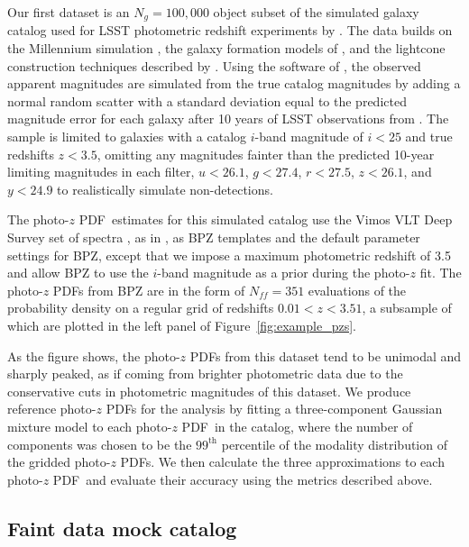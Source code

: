 \documentclass[\docopts]{\docclass}
\newcommand{\pz}{photo-$z$ PDF}
\newcommand{\Ssdata}{Faint\xspace}
\begin{document}
Our first dataset is an $N_{g}=100,000$ object subset of the simulated galaxy 
catalog used for LSST photometric redshift experiments by 
\citet{graham_photometric_2017}.
The data builds on the Millennium simulation \citep{springel_simulations_2005}, 
the galaxy formation models of \citet{gonzalez-perez_how_2014}, and the 
lightcone construction techniques described by \citet{merson_lightcone_2013}.
Using the software of \citet{connolly_end--end_2014}, the observed apparent 
magnitudes are simulated from the true catalog magnitudes by adding a normal 
random scatter with a standard deviation equal to the predicted magnitude error 
for each galaxy after 10 years of LSST observations from 
\citet{ivezic_lsst:_2008}.
The sample is limited to galaxies with a catalog $i$-band magnitude of $i<25$ 
and true redshifts $z<3.5$, omitting any magnitudes fainter than the predicted 
10-year limiting magnitudes in each filter, $u<26.1$, $g<27.4$, $r<27.5$, 
$z<26.1$, and $y<24.9$ to realistically simulate non-detections.

The \pz\ estimates for this simulated catalog use the Vimos VLT Deep Survey set 
of spectra \citep{fevre_vimos_2005}, as in \citet{ilbert_accurate_2006}, as BPZ 
templates and the default parameter settings for BPZ, except that we impose a 
maximum photometric redshift of 3.5 and allow BPZ to use the $i$-band magnitude 
as a prior during the photo-$z$ fit.
The \pz s from BPZ are in the form of $N_{ff} = 351$ evaluations of the 
probability density on a regular grid of redshifts $0.01 < z < 3.51$, a 
subsample of which are plotted in the left panel of 
Figure~\ref{fig:example_pzs}.

As the figure shows, the \pz s from this dataset tend to be unimodal and 
sharply peaked, as if coming from brighter photometric data due to the 
conservative cuts in photometric magnitudes of this dataset.
We produce reference \pz s for the analysis by fitting a three-component 
Gaussian mixture model to each \pz\ in the catalog, where the number of 
components was chosen to be the $99^{\mathrm{th}}$ percentile of the modality 
distribution of the gridded \pz s.
We then calculate the three approximations to each \pz\ and evaluate their 
accuracy using the metrics described above.

\subsection{\Ssdata data mock catalog}
\label{sec:schmidt}
\end{document}
